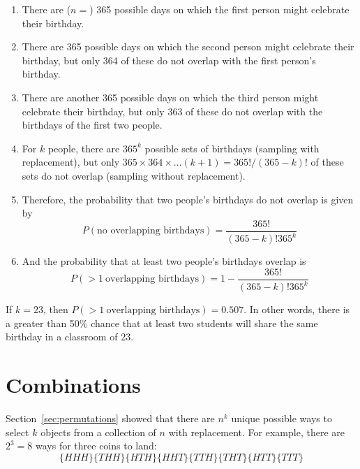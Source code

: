 \begin{enumerate}
\item There are ($n=$) 365 possible days on which the first person might
  celebrate their birthday.
\item There are 365 possible days on which the second person might
  celebrate their birthday, but only 364 of these do not overlap with
  the first person's birthday.
\item There are another 365 possible days on which the third person
  might celebrate their birthday, but only 363 of these do not overlap
  with the birthdays of the first two people.
\item For $k$ people, there are $365^k$ possible sets of birthdays
  (sampling with replacement), but only
  $365\times{364}\times{\ldots}(k+1) = 365!/(365-k)!$ of these sets do
  not overlap (sampling without replacement).
\item Therefore, the probability that two people's birthdays do
  not overlap is given by
  \[
  P(\mbox{no overlapping birthdays}) = \frac{365!}{(365-k)!365^k}
  \]
\item And the probability that at least two people's birthdays
  overlap is
  \[
  P(>1~\mbox{overlapping birthdays}) = 1 - \frac{365!}{(365-k)!365^k}
  \]  
\end{enumerate}

If $k = 23$, then $P(>1~\mbox{overlapping birthdays}) = 0.507$. In
other words, there is a greater than 50\% chance that at least two
students will share the same birthday in a classroom of 23.

\section{Combinations}
\label{sec:combinations}

Section~\ref{sec:permutations} showed that there are $n^k$ unique
possible ways to select $k$ objects from a collection of $n$ with
replacement. For example, there are $2^3=8$ ways for three coins to
land:
\[\{HHH\}\{THH\}\{HTH\}\{HHT\}\{TTH\}\{THT\}\{HTT\}\{TTT\}\]

